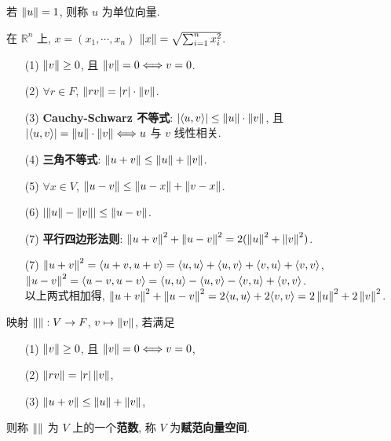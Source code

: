 \documentclass{note}
\begin{document}
\begin{df}[单位向量]
    若 $\left\lVert u\right\rVert=1$, 则称 $u$ 为单位向量.
\end{df}

\begin{eg}
    在 $\mathbb{R}^n$ 上, $x=(x_1,\cdots,x_n)$ $\left\lVert x\right\rVert=\sqrt{\sum_{i=1}^nx_i^2}$.
\end{eg}

\begin{thm}
    \begin{itemize}
        \item[(1)] $\left\lVert v\right\rVert\geq 0$, 且 $\left\lVert v\right\rVert=0\Longleftrightarrow v=0$.
        \item[(2)] $\forall r\in F$, $\left\lVert rv\right\rVert=\left\lvert r\right\rvert\cdot\left\lVert v\right\rVert$.
        \item[(3)] \textbf{Cauchy-Schwarz 不等式}: $\left\lvert\langle u,v\rangle\right\rvert\leq\left\lVert u\right\rVert\cdot\left\lVert v\right\rVert$, 且 $\left\lvert\langle u,v\rangle\right\rvert=\left\lVert u\right\rVert\cdot\left\lVert v\right\rVert\Longleftrightarrow u$ 与 $v$ 线性相关.
        \item[(4)] \textbf{三角不等式}: $\left\lVert u+v\right\rVert\leq\left\lVert u\right\rVert+\left\lVert v\right\rVert$.
        \item[(5)] $\forall x\in V$, $\left\lVert u-v\right\rVert\leq\left\lVert u-x\right\rVert+\left\lVert v-x\right\rVert$.
        \item[(6)] $\left\lvert\left\lVert u\right\rVert-\left\lVert v\right\rVert\right\rvert\leq\left\lVert u-v\right\rVert$.
        \item[(7)] \textbf{平行四边形法则}: $\left\lVert u+v\right\rVert^2+\left\lVert u-v\right\rVert^2=2(\left\lVert u\right\rVert^2+\left\lVert v\right\rVert^2)$.
    \end{itemize}
\end{thm}
\begin{pf}
    \begin{itemize}
        \item[(7)] $\left\lVert u+v\right\rVert^2=\langle u+v,u+v\rangle=\langle u,u\rangle+\langle u,v\rangle+\langle v,u\rangle+\langle v,v\rangle$, $\left\lVert u-v\right\rVert^2=\langle u-v,u-v\rangle=\langle u,u\rangle-\langle u,v\rangle-\langle v,u\rangle+\langle v,v\rangle$.\\
        以上两式相加得, $\left\lVert u+v\right\rVert^2+\left\lVert u-v\right\rVert^2=2\langle u,u\rangle+2\langle v,v\rangle=2\left\lVert u\right\rVert^2+2\left\lVert v\right\rVert^2$.
    \end{itemize}
\end{pf}

\begin{df}[范数和赋范向量空间]
    映射 $\left\lVert\right\rVert:V\rightarrow F$, $v\mapsto\left\lVert v\right\rVert$, 若满足
    \begin{itemize}
        \item[(1)] $\left\lVert v\right\rVert\geq 0$, 且 $\left\lVert v\right\rVert=0\Longleftrightarrow v=0$,
        \item[(2)] $\left\lVert rv\right\rVert=\left\lvert r\right\rvert\left\lVert v\right\rVert$,
        \item[(3)] $\left\lVert u+v\right\rVert\leq\left\lVert u\right\rVert+\left\lVert v\right\rVert$,
    \end{itemize}
    则称 $\left\lVert\right\rVert$ 为 $V$ 上的一个\textbf{范数}, 称 $V$ 为\textbf{赋范向量空间}.
\end{df}
\end{document}
